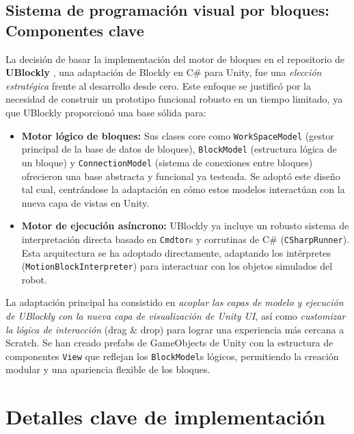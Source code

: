 \subsection{Sistema de programación visual por bloques: Componentes clave}
La decisión de basar la implementación del motor de bloques en el repositorio de \textbf{UBlockly} \cite{UBlockly}, una adaptación de Blockly en C\# para Unity, fue una \textit{elección estratégica} frente al desarrollo desde cero. Este enfoque se justificó por la necesidad de construir un prototipo funcional robusto en un tiempo limitado, ya que UBlockly proporcionó una base sólida para:
\begin{itemize}
	\item \textbf{Motor lógico de bloques:} Sus clases core como \texttt{WorkSpaceModel} (gestor principal de la base de datos de bloques), \texttt{BlockModel} (estructura lógica de un bloque) y \texttt{ConnectionModel} (sistema de conexiones entre bloques) ofrecieron una base abstracta y funcional ya testeada. Se adoptó este diseño tal cual, centrándose la adaptación en cómo estos modelos interactúan con la nueva capa de vistas en Unity.
	\item \textbf{Motor de ejecución asíncrono:} UBlockly ya incluye un robusto sistema de interpretación directa basado en \texttt{Cmdtor}s y corrutinas de C\# (\texttt{CSharpRunner}). Esta arquitectura se ha adoptado directamente, adaptando los intérpretes (\texttt{MotionBlockInterpreter}) para interactuar con los objetos simulados del robot.
\end{itemize}
La adaptación principal ha consistido en \textit{acoplar las capas de modelo y ejecución de UBlockly con la nueva capa de visualización de Unity UI}, así como \textit{customizar la lógica de interacción} (drag \& drop) para lograr una experiencia más cercana a Scratch. Se han creado prefabs de GameObjects de Unity con la estructura de componentes \texttt{View} que reflejan los \texttt{BlockModel}s lógicos, permitiendo la creación modular y una apariencia flexible de los bloques.

\section{Detalles clave de implementación}

